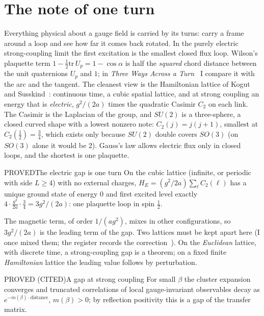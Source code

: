 \section{The note of one turn}

Everything physical about a gauge field is carried by its turns: carry a frame around a loop and see how far it comes
back rotated. In the purely electric strong-coupling limit the first excitation is the
smallest closed flux loop. Wilson's plaquette term $1-\tfrac12\mathrm{tr}\,U_p=1-\cos\alpha$
is half the \emph{squared} chord distance between the unit quaternions $U_p$ and $1$; in \emph{Three Ways Across a Turn}~\cite{ThreeWays}
I compare it with the arc and the tangent. The cleanest view is the Hamiltonian lattice of Kogut and
Susskind~\cite{KogutSusskind75}: continuous time, a cubic spatial lattice, and at strong coupling an energy that is
\emph{electric}, $g^2/(2a)$ times the quadratic Casimir $C_2$ on each link. The Casimir is the Laplacian of the group,
and $SU(2)$ is a three-sphere, a closed curved shape with a lowest nonzero note: $C_2(j)=j(j+1)$, smallest at
$C_2(\tfrac12)=\tfrac34$, which exists only because $SU(2)$ double covers $SO(3)$ (on $SO(3)$ alone it would be $2$).
Gauss's law allows electric flux only in closed loops, and the shortest is one plaquette.

\begin{claim}{PROVED}{The electric gap is one turn}\label{b:electric}
On the cubic lattice (infinite, or periodic with side $L\ge4$) with no external charges, $H_E=(g^2/2a)\sum_\ell C_2(\ell)$
has a unique ground state of energy $0$ and first excited level exactly $4\cdot\tfrac{g^2}{2a}\cdot\tfrac34=3g^2/(2a)$:
one plaquette loop in spin $\tfrac12$.
\end{claim}

The magnetic term, of order $1/(ag^2)$, mixes in other configurations, so $3g^2/(2a)$ is the leading term of the gap. Two
lattices must be kept apart here (I once mixed them; the register records the correction~\cite{ClosedSet}). On the
\emph{Euclidean} lattice, with discrete time, a strong-coupling gap is a theorem; on a fixed finite
\emph{Hamiltonian} lattice the leading value follows by perturbation.

\begin{claim}{PROVED (CITED)}{A gap at strong coupling}\label{b:strong}
For small $\beta$ the cluster expansion converges and truncated correlations of local gauge-invariant observables decay as
$e^{-m(\beta)\cdot\text{distance}}$, $m(\beta)>0$; by reflection positivity this is a gap of the transfer matrix.
\end{claim}

